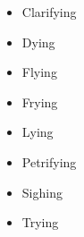 \begin{itemize}

    \item Clarifying
    \item Dying
    \item Flying
    \item Frying
    \item Lying
    \item Petrifying
    \item Sighing
    \item Trying

\end{itemize}

